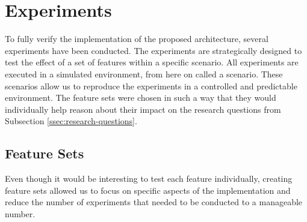 \section{Experiments}
\label{sec:experiments}
To fully verify the implementation of the proposed architecture, several experiments have been conducted. The experiments are strategically designed to test the effect of a set of features within a specific scenario. All experiments are executed in a simulated environment, from here on called a scenario. These scenarios allow us to reproduce the experiments in a controlled and predictable environment. The feature sets were chosen in such a way that they would individually help reason about their impact on the research questions from Subsection \ref{ssec:research-questions}. 

        

\subsection{Feature Sets}
Even though it would be interesting to test each feature individually, creating feature sets allowed us to focus on specific aspects of the implementation and reduce the number of experiments that needed to be conducted to a manageable number. 

